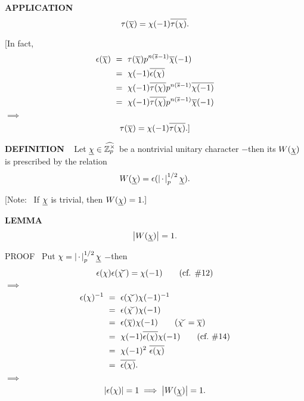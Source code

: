 \begin{x}{\small\bf APPLICATION} \ %
\[
\tau(\overline{\chi}) = \chi(-1)\overline{\tau(\chi)}.
\]

[In fact,
\begin{align*}
\epsilon(\ov{\chi})  	\ 
&=\   \tau(\ov{\chi}) p^{n(\ov{s} - 1)} \ov{\chi}(-1)\\	
&=\   \chi(-1)\ov{\epsilon(\chi)}\\
&=\   \chi(-1)\ov{\tau(\chi)}p^{n(\ov{s} - 1)} \ov{\chi(-1)}\\
&=\   \chi(-1)\ov{\tau(\chi)}p^{n(\ov{s} - 1)} \ov{\chi}(-1)
\end{align*}
\qquad\qquad\qquad$\implies$
\[
\tau(\overline{\chi}) = \chi(-1)\overline{\tau(\chi)}.]
\]
\end{x}

\vspace{0.1cm}

\begin{x}{\small\bf DEFINITION} \ %
Let $\underline{\chi} \in \widehat{\mathbb{Z}_p^\times}$ be a nontrivial unitary character $-$then its  
$W(\underline{\chi}) $ is prescribed by the relation
\[
W(\underline{\chi}) = \epsilon(\left\vert\hspace{0.05cm} \cdot \hspace{0.05cm}\right\vert_p^{1/2} \underline{\chi}).
\]

[Note: \  If $\underline{\chi}$ is trivial, then $W(\underline{\chi}) = 1.]$
\end{x}

\vspace{0.1cm}

\begin{x}{\small\bf LEMMA} \ %
\[
\left\vert W(\underline{\chi})\right\vert = 1.
\]

\vspace{0.1cm}

PROOF \ 
Put $\chi = \left\vert\hspace{0.05cm} \cdot \hspace{0.05cm}\right\vert_p^{1/2} \underline{\chi}$ $-$then
\[
\epsilon(\chi)\epsilon(\widecheck{\chi}) = \chi(-1) 	\qquad \text{(cf. } \# 12)
\]
$\implies$
\begin{align*}
\epsilon(\chi)^{-1}  \ 	
&=\   \epsilon(\widecheck{\chi}) \chi(-1)^{-1}\\	
&=\   \epsilon(\widecheck{\chi}) \chi(-1)\\
&=\   \epsilon(\ov{\chi}) \chi(-1) \qquad (\widecheck{\chi} = \ov{\chi})\\
&=\   \chi(-1) \ov{\epsilon(\chi)} \chi(-1) \qquad (\text{cf.} \  \#14)\\
&=\   \chi(-1)^2 \ \ov{\epsilon(\chi)}\\
&=\   \ov{\epsilon(\chi)}.
\end{align*}
$\implies$
\[
\left\vert\epsilon(\chi)\right\vert = 1 \implies \left\vert W(\underline{\chi})\right\vert = 1.
\]
\end{x}

